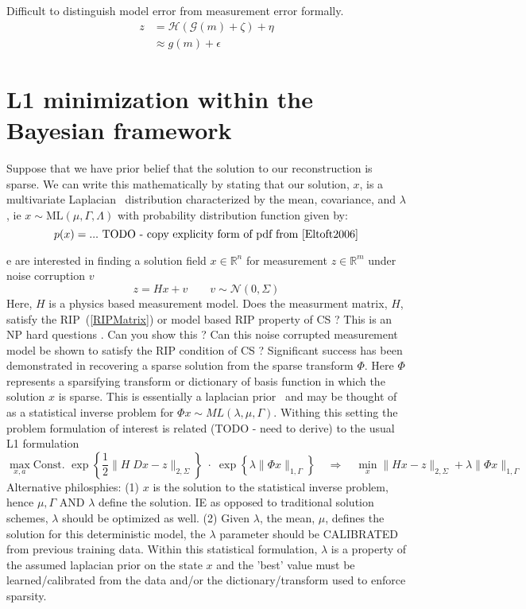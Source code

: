 \documentclass[10pt]{amsart}
\newcommand{\eqn}[1]{(\ref{#1})}
\begin{document}
Difficult to distinguish model error from measurement error
formally.
\[ 
\begin{split}
    z &     =   \mathcal{H}(\mathcal{G}(m) + \zeta) + \eta  \\
      & \approx g(m) + \epsilon
 \end{split}
\]

\section{L1 minimization within the Bayesian framework }
Suppose that we have prior belief that the
solution to our reconstruction is sparse. We can write this
mathematically by stating that our solution, $x$, is a
multivariate Laplacian~\cite{Eltoft2006} distribution characterized by the mean, covariance,
and $\lambda$, ie $x \sim \text{ML}(\mu,\Gamma,\Lambda)$ with probability
distribution function given by:
\[
   p(x) = ...  \text{ TODO - copy explicity form of pdf from \cite{Eltoft2006}}
\]

e are interested in finding a solution field $x \in \mathbb{R}^n$
for  measurement $z \in \mathbb{R}^m$ under noise corruption $v$
\[
   z = H x + v   \qquad v \sim \mathcal{N} (0,\Sigma)
\]
Here, $H$ is a physics based measurement model.
{\color{red} Does the measurment matrix, $H$, satisfy the RIP~\eqn{RIPMatrix} 
or model based RIP property of CS ? This is an NP hard questions \cite{natarajan1995sparse}.
Can you show this ? 
Can this noise corrupted measurement model be shown to satisfy the RIP condition of CS
\cite{Donoho2006a,Baraniuk2010}?  }
Significant success has been demonstrated
in recovering a sparse solution from the sparse transform $\Phi$.
Here $\Phi$ represents a sparsifying transform or  dictionary  of basis
function in which the solution $x$ is sparse. 
This is essentially a laplacian prior~\cite{Eltoft2006,Babacan2010} and may be thought of 
as a statistical inverse problem for $ \Phi x \sim ML(\lambda, \mu,\Gamma)$.
Withing this setting the problem formulation of interest is related 
{\color{red}(TODO - need to derive)} to the usual L1 formulation
\[
            \max_{x,a}  \text{Const. } 
          \exp \left\{ \frac{1}{2} \|H\; Dx -z\|_{2,\Sigma} \right\} 
               \; \cdot \;
          \exp  \left\{ \lambda  \| \Phi x\|_{1,\Gamma}\right\} 
               \quad \Rightarrow \quad
   \min_{x} \|Hx -z \|_{2,\Sigma} + \lambda \| \Phi x\|_{1,\Gamma}
\]
{\color{red} Alternative philosphies: (1) $x$ is the solution to the
statistical inverse problem, hence $\mu,\Gamma$ AND $\lambda$ define the
solution. IE as opposed to traditional solution schemes, $\lambda$ should be
optimized as well.  
(2) Given $\lambda$, the mean, $\mu$, defines  the
solution for this deterministic model, the $\lambda$ parameter should be 
CALIBRATED from previous training data.
Within this statistical formulation,
$\lambda$ is a property of the assumed laplacian prior on the state $x$
and the 'best' value must be learned/calibrated from the data and/or the
dictionary/transform used to enforce sparsity.
}
\end{document}
